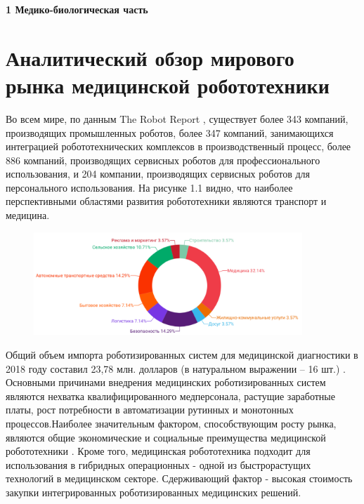 
\newpage
\textbf {1 Медико-биологическая часть}

\section{Аналитический обзор мирового рынка медицинской робототехники}
Во всем мире, по данным The Robot Report \cite{litlink1}, существует более 343 компаний, производящих промышленных роботов, более 347 компаний, занимающихся интеграцией робототехнических комплексов в производственный процесс, более 886 компаний, производящих сервисных роботов для профессионального использования, и 204 компании, производящих сервисных роботов для персонального использования. На рисунке 1.1 видно, что наиболее перспективными областями развития робототехники являются транспорт и медицина.

\begin{figure}[!h]
\begin{center}
\includegraphics[width=0.9\textwidth]{Рисунки/диаграмма стата.png}
\caption{\centering {}}
\label{част}
\end{center}
\end{figure}

Общий объем импорта роботизированных систем для медицинской диагностики в 2018 году составил 23,78 млн. долларов (в натуральном выражении – 16 шт.) \cite{litlink2}. Основными причинами внедрения медицинских роботизированных систем являются нехватка квалифицированного медперсонала, растущие заработные платы, рост потребности в автоматизации рутинных и монотонных процессов.Наиболее значительным фактором, способствующим росту рынка, являются общие экономические и социальные преимущества медицинской робототехники \cite{litlink3}. Кроме того, медицинская робототехника подходит для использования в гибридных операционных - одной из быстрорастущих технологий в медицинском секторе. Сдерживающий фактор - высокая стоимость закупки интегрированных роботизированных медицинских решений.

